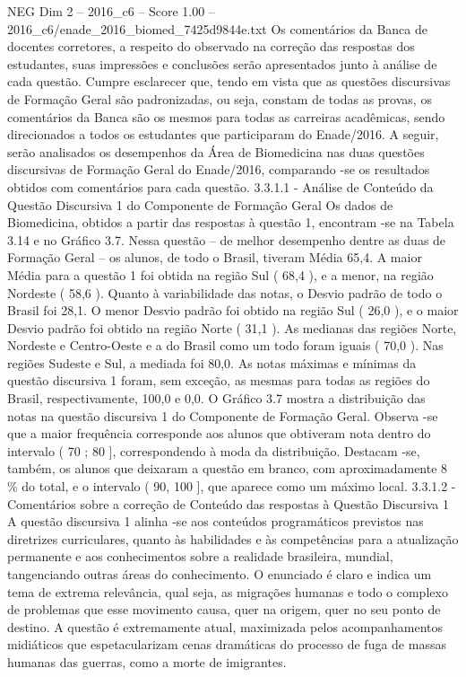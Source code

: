 \begin{textsample}{NEG Dim 2 – 2016\_c6 – Score 1.00 – 2016\_c6/enade\_2016\_biomed\_7425d9844e.txt}
Os comentários da Banca de docentes corretores, a respeito do observado na correção das respostas dos estudantes, suas impressões e conclusões serão apresentados junto à análise de cada questão.
Cumpre esclarecer que, tendo em vista que as questões discursivas de Formação Geral são padronizadas, ou seja, constam de todas as provas, os comentários da Banca são os mesmos para todas as carreiras acadêmicas, sendo direcionados a todos os estudantes que participaram do Enade/2016.
A seguir, serão analisados os desempenhos da Área de Biomedicina nas duas questões discursivas de Formação Geral do Enade/2016, comparando -se os resultados obtidos com comentários para cada questão. 3.3.1.1 - Análise de Conteúdo da Questão Discursiva 1 do Componente de Formação Geral Os dados de Biomedicina, obtidos a partir das respostas à questão 1, encontram -se na Tabela 3.14 e no Gráfico 3.7.
Nessa questão – de melhor desempenho dentre as duas de Formação Geral – os alunos, de todo o Brasil, tiveram Média 65,4.
A maior Média para a questão 1 foi obtida na região Sul ( 68,4 ), e a menor, na região Nordeste ( 58,6 ).
Quanto à variabilidade das notas, o Desvio padrão de todo o Brasil foi 28,1.
O menor Desvio padrão foi obtido na região Sul ( 26,0 ), e o maior Desvio padrão foi obtido na região Norte ( 31,1 ).
As medianas das regiões Norte, Nordeste e Centro-Oeste e a do Brasil como um todo foram iguais ( 70,0 ).
Nas regiões Sudeste e Sul, a mediada foi 80,0.
As notas máximas e mínimas da questão discursiva 1 foram, sem exceção, as mesmas para todas as regiões do Brasil, respectivamente, 100,0 e 0,0.
O Gráfico 3.7 mostra a distribuição das notas na questão discursiva 1 do Componente de Formação Geral.
Observa -se que a maior frequência corresponde aos alunos que obtiveram nota dentro do intervalo ( 70 ; 80 ], correspondendo à moda da distribuição.
Destacam -se, também, os alunos que deixaram a questão em branco, com aproximadamente 8 \% do total, e o intervalo ( 90, 100 ], que aparece como um máximo local. 3.3.1.2 - Comentários sobre a correção de Conteúdo das respostas à Questão Discursiva 1 A questão discursiva 1 alinha -se aos conteúdos programáticos previstos nas diretrizes curriculares, quanto às habilidades e às competências para a atualização permanente e aos conhecimentos sobre a realidade brasileira, mundial, tangenciando outras áreas do conhecimento.
O enunciado é claro e indica um tema de extrema relevância, qual seja, as migrações humanas e todo o complexo de problemas que esse movimento causa, quer na origem, quer no seu ponto de destino.
A questão é extremamente atual, maximizada pelos acompanhamentos midiáticos que espetacularizam cenas dramáticas do processo de fuga de massas humanas das guerras, como a morte de imigrantes.

\end{textsample}
